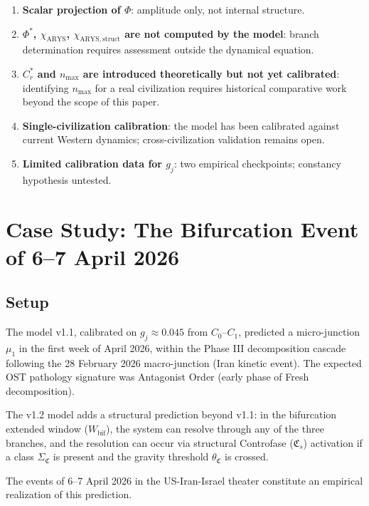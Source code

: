 \documentclass[12pt,a4paper]{article}
\newcommand{\reagmeta}{C_r^{*}}
\newcommand{\gj}{g_j}
\newcommand{\Phistar}{\Phi^{*}}
\newcommand{\nmax}{n_{\mathrm{max}}}
\newcommand{\CFs}{\mathfrak{C}_s}        %
\newcommand{\SigmaCF}{\Sigma_{\mathfrak{C}}}  %
\newcommand{\thetaCF}{\theta_{\mathfrak{C}}}   %
\begin{document}
\begin{enumerate}[label=(\roman*)]
    \item \textbf{Scalar projection of $\Phi$}: amplitude only, not internal structure.
    \item \textbf{$\Phistar$, $\chi_{\mathrm{ARYS}}$, $\chi_{\mathrm{ARYS,struct}}$ are not computed by the model}: branch determination requires assessment outside the dynamical equation.
    \item \textbf{$\reagmeta$ and $\nmax$ are introduced theoretically but not yet calibrated}: identifying $\nmax$ for a real civilization requires historical comparative work beyond the scope of this paper.
    \item \textbf{Single-civilization calibration}: the model has been calibrated against current Western dynamics; cross-civilization validation remains open.
    \item \textbf{Limited calibration data for $\gj$}: two empirical checkpoints; constancy hypothesis untested.
\end{enumerate}


\section{Case Study: The Bifurcation Event of 6--7 April 2026}\label{sec:case_study}

\subsection{Setup}

The model v1.1, calibrated on $\gj \approx 0.045$ from $C_0$--$C_1$, predicted a micro-junction $\mu_1$ in the first week of April 2026, within the Phase III decomposition cascade following the 28 February 2026 macro-junction (Iran kinetic event). The expected OST pathology signature was Antagonist Order (early phase of Fresh decomposition).

The v1.2 model adds a structural prediction beyond v1.1: in the bifurcation extended window ($W_{\mathrm{bif}}$), the system can resolve through any of the three branches, and the resolution can occur via structural Controfase ($\CFs$) activation if a class $\SigmaCF$ is present and the gravity threshold $\thetaCF$ is crossed.

The events of 6--7 April 2026 in the US-Iran-Israel theater constitute an empirical realization of this prediction.
\end{document}
